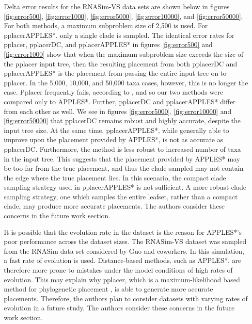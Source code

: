 \documentclass[10pt]{article}
\begin{document}
Delta error results for the RNASim-VS data sets
are shown below in figures
\ref{fig:error500},
\ref{fig:error1000},
\ref{fig:error5000},
\ref{fig:error10000},
and
\ref{fig:error50000},
For both methods, a maximum subproblem size of 2,500 is used.
For pplacerAPPLES*, only a single clade is sampled.
The identical error rates for pplacer, pplacerDC, and pplacerAPPLES* in figures \ref{fig:error500} and \ref{fig:error1000}
show that when the maximum subproblem size exceeds the size of the pplacer input tree, then the resulting placement from both pplacerDC and pplacerAPPLES* is the placement from passing the entire input tree on to pplacer.
In the 5,000, 10,000, and 50,000 taxa cases,  however, this is no longer the case.
Pplacer frequently fails, according to \cite{balaban_apples_2020}, and so our two methods were compared only to APPLES*. Further, pplacerDC and pplacerAPPLES* differ from each other as well.
We see in figures \ref{fig:error5000}, \ref{fig:error10000} and \ref{fig:error50000}
that pplacerDC remains robust and highly accurate, despite the input tree size.
At the same time, pplacerAPPLES*, while generally able to improve upon the
placement provided by APPLES*, is not as accurate as pplacerDC.
Furthermore, the method is less robust to increased number of taxa in the input tree.
This suggests that the placement provided by APPLES* may
be too far from the true placement, and thus the clade sampled may not contain
the edge where the true placement lies.
In this scenario, the compact clade sampling strategy used in pplacerAPPLES*
is not sufficient.
A more robust clade sampling strategy, one which samples the entire leafset,
rather than a compact clade, may produce more accurate placements.
The authors consider these concerns in the future work section.

It is possible that the evolution rate in the dataset is the reason for APPLES*'s poor performance across the dataset sizes.
The RNASim-VS dataset was sampled from the RNASim data set considered by Guo and coworkers\cite{guo}.
In this simulation, a fast rate of evolution is used.
Distance-based methods, such as APPLES*, are therefore more prone to mistakes
under the model conditions of high rates of evolution.
This may explain why pplacer, which is a maximum-likelihood based method for phylogenetic placement \cite{matsen_pplacer_2010},
is able to generate more accurate placements.
Therefore, the authors plan to consider datasets with varying rates of evolution in a future study.
The authors consider these concerns in the future work section.
\end{document}
